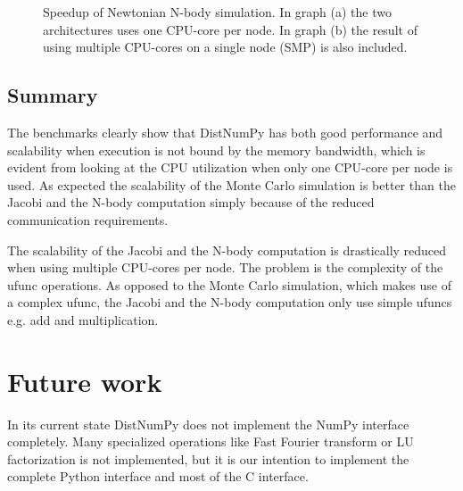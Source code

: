 \documentclass[10pt]{article}
\begin{document}
\begin{figure}%
  \begin{center}%
    \caption{Speedup of Newtonian N-body simulation. In graph (a) the two architectures uses one CPU-core per node. In graph (b) the result of using multiple CPU-cores on a single node (SMP) is also included.}%
    \label{fig:NbodyScale}%
  \end{center}
\end{figure}


\subsection{Summary}
The benchmarks clearly show that DistNumPy has both good performance and scalability when execution is not bound by the memory bandwidth, which is evident from looking at the CPU utilization when only one CPU-core per node is used. As expected the scalability of the Monte Carlo simulation is better than the Jacobi and the N-body computation simply because of the reduced communication requirements. 

The scalability of the Jacobi and the N-body computation is drastically reduced when using multiple CPU-cores per node. The problem is the complexity of the ufunc operations. As opposed to the Monte Carlo simulation, which makes use of a complex ufunc, the Jacobi and the N-body computation only use simple ufuncs e.g. add and multiplication.



\section{Future work}
In its current state DistNumPy does not implement the NumPy interface completely. Many specialized operations like Fast Fourier transform or LU factorization is not implemented, but it is our intention to implement the complete Python interface and most of the C interface.
\end{document}
